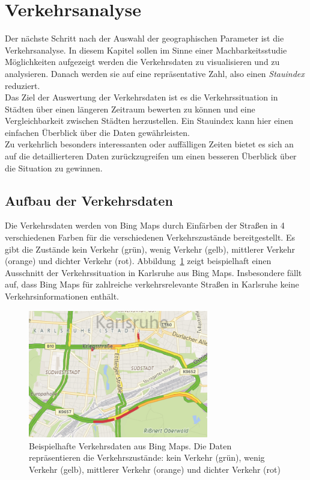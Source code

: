 \section{Verkehrsanalyse}
Der nächste Schritt nach der Auswahl der geographischen Parameter ist die Verkehrsanalyse. In diesem Kapitel sollen im Sinne einer Machbarkeitsstudie Möglichkeiten aufgezeigt werden die Verkehrsdaten zu visualisieren und zu analysieren. Danach werden sie auf eine repräsentative Zahl, also einen \textit{Stauindex}  reduziert.\\
Das Ziel der Auswertung der Verkehrsdaten ist es die Verkehrssituation in Städten über einen längeren Zeitraum bewerten zu können und eine Vergleichbarkeit zwischen Städten herzustellen. Ein Stauindex kann hier einen einfachen Überblick über die Daten gewährleisten.\\ 
Zu verkehrlich besonders interessanten oder auffälligen Zeiten bietet es sich an auf die detaillierteren Daten zurückzugreifen um einen besseren Überblick über die Situation zu gewinnen.

\subsection{Aufbau der Verkehrsdaten}
Die Verkehrsdaten werden von Bing Maps durch Einfärben der Straßen in 4 verschiedenen Farben für die verschiedenen Verkehrszustände bereitgestellt. Es gibt die Zustände kein Verkehr (grün), wenig Verkehr (gelb), mittlerer Verkehr (orange) und dichter Verkehr (rot). Abbildung~\ref{fig:farben_einfuehrung} zeigt beispielhaft einen Ausschnitt der Verkehrssituation in Karlsruhe aus Bing Maps. Insbesondere fällt auf, dass Bing Maps für zahlreiche verkehrsrelevante Straßen in Karlsruhe keine Verkehrsinformationen enthält.\\
\begin{figure}
  \centering
    \includegraphics[width=0.7\textwidth]{images/verkehr_einfuehrung.png}
    \caption{Beispielhafte Verkehrsdaten aus Bing Maps. Die Daten repräsentieren die  Verkehrszustände: kein Verkehr (grün), wenig Verkehr (gelb), mittlerer Verkehr (orange) und dichter Verkehr (rot)}
    \label{fig:farben_einfuehrung}
\end{figure}

